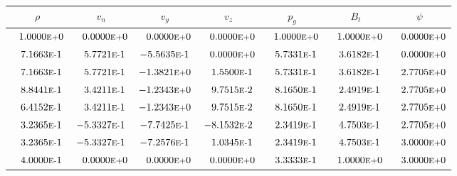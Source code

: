 \begin{tabular*}{\textwidth}{@{\extracolsep{\fill}} ccccccc}
\\ 
\hline 
\hline 
$\rho$ & $v_n$ & $v_y$ & $v_z$ & $p_g$ & $B_t$ & $\psi$ \\ 
\hline 
$\phantom{-} 1.0000\mbox{\sc{e}\smaller{+}}0$ & $\phantom{-} 0.0000\mbox{\sc{e}\smaller{+}}0$ & $\phantom{-} 0.0000\mbox{\sc{e}\smaller{+}}0$ & $\phantom{-} 0.0000\mbox{\sc{e}\smaller{+}}0$ & $\phantom{-} 1.0000\mbox{\sc{e}\smaller{+}}0$ & $\phantom{-} 1.0000\mbox{\sc{e}\smaller{+}}0$ & $\phantom{-} 0.0000\mbox{\sc{e}\smaller{+}}0$ \\ 
$\phantom{-} 7.1663\mbox{\sc{e}\smaller{-}}1$ & $\phantom{-} 5.7721\mbox{\sc{e}\smaller{-}}1$ & $-5.5635\mbox{\sc{e}\smaller{-}}1$ & $\phantom{-} 0.0000\mbox{\sc{e}\smaller{+}}0$ & $\phantom{-} 5.7331\mbox{\sc{e}\smaller{-}}1$ & $\phantom{-} 3.6182\mbox{\sc{e}\smaller{-}}1$ & $\phantom{-} 0.0000\mbox{\sc{e}\smaller{+}}0$ \\ 
$\phantom{-} 7.1663\mbox{\sc{e}\smaller{-}}1$ & $\phantom{-} 5.7721\mbox{\sc{e}\smaller{-}}1$ & $-1.3821\mbox{\sc{e}\smaller{+}}0$ & $\phantom{-} 1.5500\mbox{\sc{e}\smaller{-}}1$ & $\phantom{-} 5.7331\mbox{\sc{e}\smaller{-}}1$ & $\phantom{-} 3.6182\mbox{\sc{e}\smaller{-}}1$ & $\phantom{-} 2.7705\mbox{\sc{e}\smaller{+}}0$ \\ 
$\phantom{-} 8.8441\mbox{\sc{e}\smaller{-}}1$ & $\phantom{-} 3.4211\mbox{\sc{e}\smaller{-}}1$ & $-1.2343\mbox{\sc{e}\smaller{+}}0$ & $\phantom{-} 9.7515\mbox{\sc{e}\smaller{-}}2$ & $\phantom{-} 8.1650\mbox{\sc{e}\smaller{-}}1$ & $\phantom{-} 2.4919\mbox{\sc{e}\smaller{-}}1$ & $\phantom{-} 2.7705\mbox{\sc{e}\smaller{+}}0$ \\ 
$\phantom{-} 6.4152\mbox{\sc{e}\smaller{-}}1$ & $\phantom{-} 3.4211\mbox{\sc{e}\smaller{-}}1$ & $-1.2343\mbox{\sc{e}\smaller{+}}0$ & $\phantom{-} 9.7515\mbox{\sc{e}\smaller{-}}2$ & $\phantom{-} 8.1650\mbox{\sc{e}\smaller{-}}1$ & $\phantom{-} 2.4919\mbox{\sc{e}\smaller{-}}1$ & $\phantom{-} 2.7705\mbox{\sc{e}\smaller{+}}0$ \\ 
$\phantom{-} 3.2365\mbox{\sc{e}\smaller{-}}1$ & $-5.3327\mbox{\sc{e}\smaller{-}}1$ & $-7.7425\mbox{\sc{e}\smaller{-}}1$ & $-8.1532\mbox{\sc{e}\smaller{-}}2$ & $\phantom{-} 2.3419\mbox{\sc{e}\smaller{-}}1$ & $\phantom{-} 4.7503\mbox{\sc{e}\smaller{-}}1$ & $\phantom{-} 2.7705\mbox{\sc{e}\smaller{+}}0$ \\ 
$\phantom{-} 3.2365\mbox{\sc{e}\smaller{-}}1$ & $-5.3327\mbox{\sc{e}\smaller{-}}1$ & $-7.2576\mbox{\sc{e}\smaller{-}}1$ & $\phantom{-} 1.0345\mbox{\sc{e}\smaller{-}}1$ & $\phantom{-} 2.3419\mbox{\sc{e}\smaller{-}}1$ & $\phantom{-} 4.7503\mbox{\sc{e}\smaller{-}}1$ & $\phantom{-} 3.0000\mbox{\sc{e}\smaller{+}}0$ \\ 
$\phantom{-} 4.0000\mbox{\sc{e}\smaller{-}}1$ & $\phantom{-} 0.0000\mbox{\sc{e}\smaller{+}}0$ & $\phantom{-} 0.0000\mbox{\sc{e}\smaller{+}}0$ & $\phantom{-} 0.0000\mbox{\sc{e}\smaller{+}}0$ & $\phantom{-} 3.3333\mbox{\sc{e}\smaller{-}}1$ & $\phantom{-} 1.0000\mbox{\sc{e}\smaller{+}}0$ & $\phantom{-} 3.0000\mbox{\sc{e}\smaller{+}}0$ \\ 
\hline 
\end{tabular*} 
